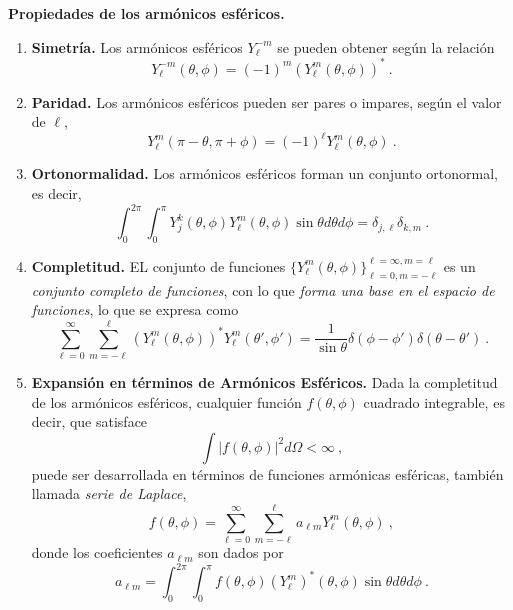 \begin{propiedad}
    \textbf{Propiedades de los armónicos esféricos.}

    \begin{enumerate}
        \item \textbf{Simetría.} Los armónicos esféricos $Y_\ell^{-m}$ se pueden obtener según la relación
        \begin{equation}
            Y_\ell^{-m}(\theta, \phi) = (-1)^m (Y_\ell^m (\theta, \phi))^\ast \ .
        \end{equation}
    
        \item \textbf{Paridad.} Los armónicos esféricos pueden ser pares o impares, según el valor de $\ell$,
        \begin{equation}
            Y_\ell^m(\pi - \theta, \pi + \phi) = (-1)^\ell Y_\ell^m(\theta, \phi) \ .
        \end{equation}
    
        \item \textbf{Ortonormalidad.} Los armónicos esféricos forman un conjunto ortonormal, es decir,
        \begin{equation}
            \int_0^{2\pi} \int_0^\pi Y_j^k(\theta, \phi) Y_\ell^m (\theta, \phi) \sin\theta d\theta d\phi = \delta_{j, \ell} \delta_{k, m} \ .
        \end{equation}
    
        \item \textbf{Completitud.} EL conjunto de funciones $\{ Y_\ell^m(\theta, \phi) \}_{\ell = 0, m = -\ell}^{\ell = \infty, m = \ell}$ es un \emph{conjunto completo de funciones}, con lo que \emph{forma una base en el espacio de funciones}, lo que se expresa como
        \begin{equation}
            \sum_{\ell = 0}^{\infty} \sum_{m = -\ell}^{\ell} (Y_\ell^m (\theta, \phi))^\ast Y_{\ell}^m (\theta', \phi') = \frac{1}{\sin \theta} \delta(\phi - \phi') \delta(\theta - \theta') \ .
        \end{equation}
        
        \item \textbf{Expansión en términos de Armónicos Esféricos.} Dada la completitud de los armónicos esféricos, cualquier función $f(\theta, \phi)$ cuadrado integrable, es decir, que satisface
        \begin{equation}
            \int | f(\theta, \phi) |^2 d\Omega < \infty \ ,
        \end{equation}
        puede ser desarrollada en términos de funciones armónicas esféricas, también llamada \emph{serie de Laplace},
        \begin{equation}
            f(\theta, \phi) = \sum_{\ell = 0}^{\infty} \sum_{m = -\ell}^{\ell} a_{\ell m} Y_\ell^m (\theta, \phi) \ ,
        \end{equation}
        donde los coeficientes $a_{\ell m}$ son dados por
        \begin{equation}
            a_{\ell m} = \int_{0}^{2\pi} \int_{0}^{\pi} f(\theta, \phi) (Y_\ell^m)^\ast (\theta, \phi) \sin\theta d\theta d\phi \ .
        \end{equation}
    

\end{enumerate}
\end{propiedad}
